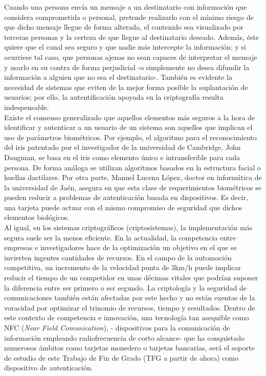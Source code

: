 \documentclass[../PFC.tex]{subfiles}
\begin{document}
Cuando una persona envía un mensaje a un destinatario con información que considera comprometida o personal, pretende realizarlo con el mínimo riesgo de que dicho mensaje llegue de forma alterada, el contenido sea visualizado por terceras personas y la certeza de que llegue al destinatario deseado. Además, éste quiere que el canal sea seguro y que nadie más intercepte la información; y si ocurriese tal caso, que personas ajenas no sean capaces de interpretar el mensaje y usarlo en su contra de forma perjudicial -o simplemente no desea difundir la información a alguien que no sea el destinatario-. También es evidente la necesidad de sistemas que eviten de la mejor forma posible la suplantación de usuarios; por ello, la autentificación apoyada en la criptografía resulta indespensable.
\*
\vspace{0.5515cm}
\\
Existe el consenso generalizado que aquellos elementos más seguros a la hora de identificar y autenticar a un usuario de un sistema son aquellos que implican el uso de parámetros biométricos. Por ejemplo, el algoritmo para el reconocimiento del iris patentado por el investigador de la universidad de Cambridge, John Daugman, se basa en el iris como elemento único e intransferible para cada persona\cite{ramli2008iris}. De forma análoga se utilizan algoritmos basados en la estructura facial o huellas dactilares. Por otra parte, Manuel Lucena López, doctor en informática de la universidad de Jaén, asegura en \cite{lucena} que esta clase de requerimientos biométricos se pueden reducir a problemas de autenticación basada en dispositivos. Es decir, una tarjeta puede actuar con el mismo compromiso de seguridad que dichos elementos biológicos.
\*
\vspace{0.5515cm}
\\
Al igual, en los sistemas criptográficos (criptosistemas), la implementación más segura suele ser la menos eficiente. En la actualidad, la competencia entre empresas e investigadores hace de la optimización un objetivo en el que se invierten ingentes cantidades de recursos. En el campo de la automoción competitiva, un incremento de la velocidad punta de 3km/h puede implicar reducir el tiempo de un competidor en unas décimas vitales que podrían suponer la diferencia entre ser primero o ser segundo. La criptología y la seguridad de comunicaciones también están afectadas por este hecho y no están exentas de la voracidad por optimizar el trinomio de recursos, tiempo y resultados. Dentro de este contexto de competencia e innovación, una tecnología tan asequible como NFC (\textit{Near Field Comunication}), - dispositivos para la comunicación de información empleando radiofrecuencia de corto alcance- que ha conquistado numerosos ámbitos como tarjetas monedero o tarjetas bancarias, será el soporte de estudio de este Trabajo de Fin de Grado (TFG a partir de ahora) como dispositivo de autenticación.
\end{document}
